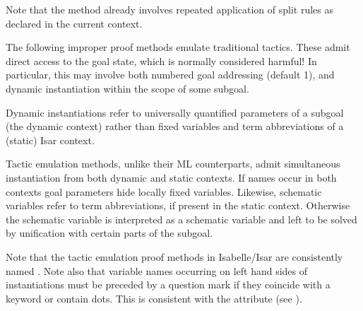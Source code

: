 \begin{isabellebody}
\begin{isamarkuptext}
\begin{description}
  Note that the \hyperlink{method.simp}{\mbox{}} method already involves repeated
  application of split rules as declared in the current context.

  \end{description}%
\end{isamarkuptext}%
\isamarkuptrue%
%
\isamarkuptrue%
%
\begin{isamarkuptext}%
The following improper proof methods emulate traditional tactics.
  These admit direct access to the goal state, which is normally
  considered harmful!  In particular, this may involve both numbered
  goal addressing (default 1), and dynamic instantiation within the
  scope of some subgoal.

  \begin{warn}
    Dynamic instantiations refer to universally quantified parameters
    of a subgoal (the dynamic context) rather than fixed variables and
    term abbreviations of a (static) Isar context.
  \end{warn}

  Tactic emulation methods, unlike their ML counterparts, admit
  simultaneous instantiation from both dynamic and static contexts.
  If names occur in both contexts goal parameters hide locally fixed
  variables.  Likewise, schematic variables refer to term
  abbreviations, if present in the static context.  Otherwise the
  schematic variable is interpreted as a schematic variable and left
  to be solved by unification with certain parts of the subgoal.

  Note that the tactic emulation proof methods in Isabelle/Isar are
  consistently named .  Note also that variable names
  occurring on left hand sides of instantiations must be preceded by a
  question mark if they coincide with a keyword or contain dots.  This
  is consistent with the attribute \hyperlink{attribute.where}{\mbox{}} (see
  ).


\end{isamarkuptext}
\end{isabellebody}
